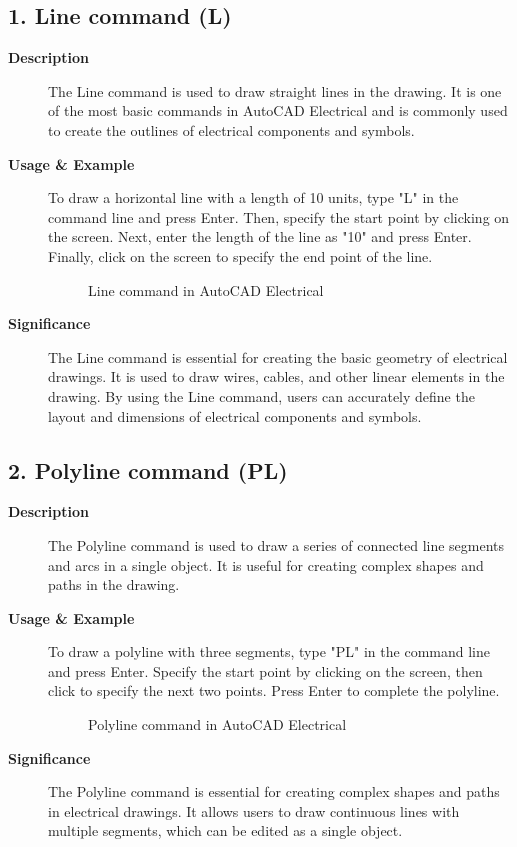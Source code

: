 \documentclass[12pt]{article}
\begin{document}
\subsection*{1. Line command (L)}
\begin{description}
    \item [\textbf{Description}] The Line command is used to draw straight lines in the drawing. It is one of the most basic commands in AutoCAD Electrical and is commonly used to create the outlines of electrical components and symbols.
    \item [\textbf{Usage \& Example}] To draw a horizontal line with a length of 10 units, type "L" in the command line and press Enter. Then, specify the start point by clicking on the screen. Next, enter the length of the line as "10" and press Enter. Finally, click on the screen to specify the end point of the line.
          \begin{figure}[H]
              \centering
              \caption{Line command in AutoCAD Electrical}
          \end{figure}
    \item [\textbf{Significance}] The Line command is essential for creating the basic geometry of electrical drawings. It is used to draw wires, cables, and other linear elements in the drawing. By using the Line command, users can accurately define the layout and dimensions of electrical components and symbols.
\end{description}

\subsection*{2. Polyline command (PL)}
\begin{description}
    \item [\textbf{Description}] The Polyline command is used to draw a series of connected line segments and arcs in a single object. It is useful for creating complex shapes and paths in the drawing.
    \item [\textbf{Usage \& Example}] To draw a polyline with three segments, type "PL" in the command line and press Enter. Specify the start point by clicking on the screen, then click to specify the next two points. Press Enter to complete the polyline.
          \begin{figure}[H]
              \centering
              \caption{Polyline command in AutoCAD Electrical}
          \end{figure}
    \item [\textbf{Significance}] The Polyline command is essential for creating complex shapes and paths in electrical drawings. It allows users to draw continuous lines with multiple segments, which can be edited as a single object.
\end{description}
\end{document}
